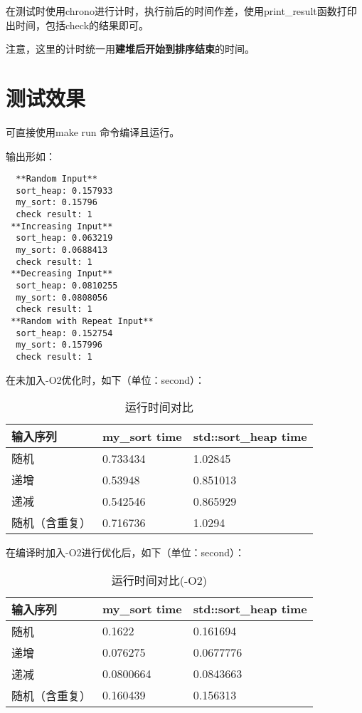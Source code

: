 \documentclass[UTF8]{ctexart}
\begin{document}
在测试时使用chrono进行计时，执行前后的时间作差，使用print\_result函数打印出时间，包括check的结果即可。

注意，这里的计时统一用\textbf{建堆后开始到排序结束}的时间。

\section{测试效果}

可直接使用make run 命令编译且运行。

输出形如：
\begin{verbatim}
  **Random Input**
  sort_heap: 0.157933
  my_sort: 0.15796
  check result: 1
 **Increasing Input**
  sort_heap: 0.063219
  my_sort: 0.0688413
  check result: 1
 **Decreasing Input**
  sort_heap: 0.0810255
  my_sort: 0.0808056
  check result: 1
 **Random with Repeat Input**
  sort_heap: 0.152754
  my_sort: 0.157996
  check result: 1
\end{verbatim}

在未加入-O2优化时，如下（单位：second）：

\begin{table}[H]
  \begin{center}
  \caption{运行时间对比}
  \begin{tabular}{l|l|l}
  \label{table1}
  \textbf{输入序列} & \textbf{my\_sort time} & \textbf{std::sort\_heap time}\\
  \hline
  随机 & 0.733434 & 1.02845\\
  递增 & 0.53948 & 0.851013\\
  递减 & 0.542546 & 0.865929\\
  随机（含重复） & 0.716736 & 1.0294
  \end{tabular}
  \end{center}
\end{table}

在编译时加入-O2进行优化后，如下（单位：second）：

\begin{table}[H]
  \begin{center}
  \caption{运行时间对比(-O2)}
  \begin{tabular}{l|l|l}
  \textbf{输入序列} & \textbf{my\_sort time} & \textbf{std::sort\_heap time}\\
  \hline
  随机 & 0.1622 & 0.161694 \\
  递增 & 0.076275 & 0.0677776 \\
  递减 & 0.0800664 & 0.0843663 \\
  随机（含重复） & 0.160439 & 0.156313
  \end{tabular}
  \end{center}
\end{table}
\end{document}

